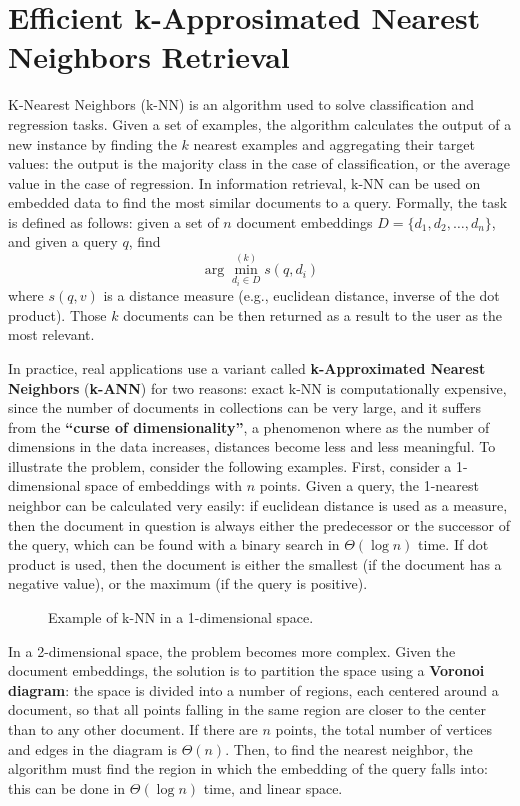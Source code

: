 \chapter{Efficient k-Approsimated Nearest Neighbors Retrieval}

K-Nearest Neighbors (k-NN) is an algorithm used to solve classification and regression tasks. Given a set of examples, the algorithm calculates the output of a new instance by finding the $k$ nearest examples and aggregating their target values: the output is the majority class in the case of classification, or the average value in the case of regression. In information retrieval, k-NN can be used on embedded data to find the most similar documents to a query. Formally, the task is defined as follows: given a set of $n$ document embeddings $D = \{d_1, d_2, \dots,d_n\}$, and given a query $q$, find
\begin{equation*}
    \arg\min_{d_i \in D}^{(k)} s(q, d_i) 
\end{equation*}
where $s(q,v)$ is a distance measure (e.g., euclidean distance, inverse of the dot product). Those $k$ documents can be then returned as a result to the user as the most relevant.

\sloppy
In practice, real applications use a variant called \textbf{k-Approximated Nearest Neighbors} (\textbf{k-ANN}) for two reasons: exact k-NN is computationally expensive, since the number of documents in collections can be very large, and it suffers from the \textbf{``curse of dimensionality''}, a phenomenon where as the number of dimensions in the data increases, distances become less and less meaningful. To illustrate the problem, consider the following examples. First, consider a 1-dimensional space of embeddings with $n$ points. Given a query, the 1-nearest neighbor can be calculated very easily: if euclidean distance is used as a measure, then the document in question is always either the predecessor or the successor of the query, which can be found with a binary search in $\Theta(\log n)$ time. If dot product is used, then the document is either the smallest (if the document has a negative value), or the maximum (if the query is positive).
\clearpage
\begin{figure}[t]
    \centering
    
    \caption{Example of k-NN in a 1-dimensional space.}
\end{figure}
\fussy
In a 2-dimensional space, the problem becomes more complex. Given the document embeddings, the solution is to partition the space using a \textbf{Voronoi diagram}: the space is divided into a number of regions, each centered around a document, so that all points falling in the same region are closer to the center than to any other document. If there are $n$ points, the total number of vertices and edges in the diagram is $\Theta(n)$. Then, to find the nearest neighbor, the algorithm must find the region in which the embedding of the query falls into: this can be done in $\Theta(\log n)$ time, and linear space.

